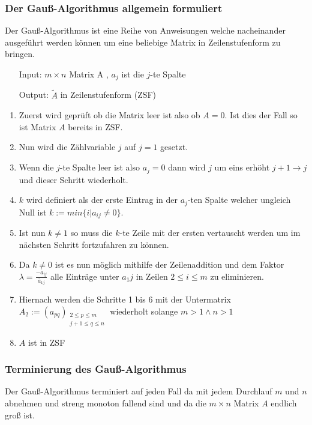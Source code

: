 \subsubsection{Der Gauß-Algorithmus allgemein formuliert}
\begin{Algo} Der Gauß-Algorithmus ist eine Reihe von Anweisungen welche nacheinander ausgeführt werden können um eine beliebige Matrix in Zeilenstufenform zu bringen.
	\begin{itemize}
		\item[Input:] $m \times n $ Matrix A , $a_j$ ist die $j$-te Spalte
		\item[Output:] $\tilde{A}$ in Zeilenstufenform (ZSF)
	\end{itemize}
\end{Algo}	
	\begin{enumerate}
		\item Zuerst wird geprüft ob die Matrix leer ist also ob $A=0$. Ist dies der Fall so ist Matrix  $A$ bereits in ZSF.
		\item Nun wird die Zählvariable $j$ auf $j=1$ gesetzt.
		\item Wenn die $j$-te Spalte leer ist also $a_j=0$ dann wird $j$ um eins erhöht $j+1\rightarrow j$ und dieser Schritt wiederholt.
		\item $k$ wird definiert als der erste Eintrag in der $a_j$-ten Spalte welcher ungleich Null ist $k:=min\{i|a_{ij}\neq0\}$.
		\item Ist nun $k\neq1$ so muss die $k$-te Zeile mit der ersten vertauscht werden um im nächsten Schritt fortzufahren zu können.
		\item Da $k\neq0$ ist es nun möglich mithilfe der Zeilenaddition und dem Faktor $\lambda=\frac{-a_{ij}}{\bar{a}_{1j}}$ alle Einträge unter $a_1j$ in Zeilen $2\leq{i}\leq{m}$
		zu eliminieren.
		\item Hiernach werden die Schritte 1 bis 6 mit der Untermatrix $A_2:=(a_{pq})_{\substack{2\leq p\leq m\\ j+1 \leq q \leq n}}$ wiederholt solange $m>1 \wedge n>1$
		\item $A$ ist in ZSF 
	\end{enumerate}
\subsubsection{Terminierung des Gauß-Algorithmus}
	Der Gauß-Algorithmus terminiert auf jeden Fall da mit jedem Durchlauf $m$ und $n$ abnehmen und streng monoton fallend sind und da die $m \times n$ Matrix $A$ endlich groß ist. 
